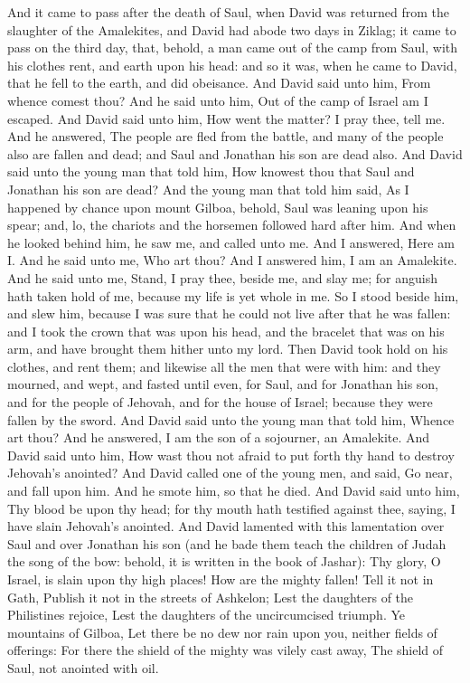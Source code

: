 


And it came to pass after the death of Saul, when David was returned from the slaughter of the Amalekites, and David had abode two days in Ziklag; it came to pass on the third day, that, behold, a man came out of the camp from Saul, with his clothes rent, and earth upon his head: and so it was, when he came to David, that he fell to the earth, and did obeisance. And David said unto him, From whence comest thou? And he said unto him, Out of the camp of Israel am I escaped. And David said unto him, How went the matter? I pray thee, tell me. And he answered, The people are fled from the battle, and many of the people also are fallen and dead; and Saul and Jonathan his son are dead also. And David said unto the young man that told him, How knowest thou that Saul and Jonathan his son are dead? And the young man that told him said, As I happened by chance upon mount Gilboa, behold, Saul was leaning upon his spear; and, lo, the chariots and the horsemen followed hard after him. And when he looked behind him, he saw me, and called unto me. And I answered, Here am I. And he said unto me, Who art thou? And I answered him, I am an Amalekite. And he said unto me, Stand, I pray thee, beside me, and slay me; for anguish hath taken hold of me, because my life is yet whole in me. So I stood beside him, and slew him, because I was sure that he could not live after that he was fallen: and I took the crown that was upon his head, and the bracelet that was on his arm, and have brought them hither unto my lord.  Then David took hold on his clothes, and rent them; and likewise all the men that were with him: and they mourned, and wept, and fasted until even, for Saul, and for Jonathan his son, and for the people of Jehovah, and for the house of Israel; because they were fallen by the sword. And David said unto the young man that told him, Whence art thou? And he answered, I am the son of a sojourner, an Amalekite. And David said unto him, How wast thou not afraid to put forth thy hand to destroy Jehovah’s anointed? And David called one of the young men, and said, Go near, and fall upon him. And he smote him, so that he died. And David said unto him, Thy blood be upon thy head; for thy mouth hath testified against thee, saying, I have slain Jehovah’s anointed.  And David lamented with this lamentation over Saul and over Jonathan his son (and he bade them teach the children of Judah the song of the bow: behold, it is written in the book of Jashar):  Thy glory, O Israel, is slain upon thy high places! How are the mighty fallen!  Tell it not in Gath, Publish it not in the streets of Ashkelon; Lest the daughters of the Philistines rejoice, Lest the daughters of the uncircumcised triumph.  Ye mountains of Gilboa, Let there be no dew nor rain upon you, neither fields of offerings: For there the shield of the mighty was vilely cast away, The shield of Saul, not anointed with oil.  